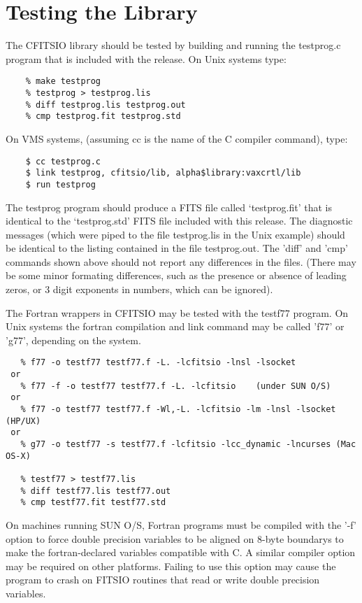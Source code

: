 \documentclass[11pt]{book}
\begin{document}
\section{Testing the Library}

The CFITSIO library should be tested by building and running
the testprog.c program that is included with the release.
On Unix systems type:

\begin{verbatim}
    % make testprog
    % testprog > testprog.lis
    % diff testprog.lis testprog.out
    % cmp testprog.fit testprog.std
\end{verbatim}
 On VMS systems,
(assuming cc is the name of the C compiler command), type:

\begin{verbatim}
    $ cc testprog.c
    $ link testprog, cfitsio/lib, alpha$library:vaxcrtl/lib
    $ run testprog
\end{verbatim}
The testprog program should produce a FITS file called `testprog.fit'
that is identical to the `testprog.std' FITS file included with this
release.  The diagnostic messages (which were piped to the file
testprog.lis in the Unix example) should be identical to the listing
contained in the file testprog.out.  The 'diff' and 'cmp' commands
shown above should not report any differences in the files.  (There
may be some minor formating differences, such as the presence or
absence of leading zeros, or 3 digit exponents in numbers,
which can be ignored).

The Fortran wrappers in CFITSIO may be tested with the testf77
program.  On Unix systems the fortran compilation and link command
may be called 'f77' or 'g77', depending on the system.

\begin{verbatim}
   % f77 -o testf77 testf77.f -L. -lcfitsio -lnsl -lsocket
 or
   % f77 -f -o testf77 testf77.f -L. -lcfitsio    (under SUN O/S)
 or
   % f77 -o testf77 testf77.f -Wl,-L. -lcfitsio -lm -lnsl -lsocket (HP/UX)
 or
   % g77 -o testf77 -s testf77.f -lcfitsio -lcc_dynamic -lncurses (Mac OS-X)

   % testf77 > testf77.lis
   % diff testf77.lis testf77.out
   % cmp testf77.fit testf77.std
\end{verbatim}
On machines running SUN O/S, Fortran programs must be compiled with the
'-f' option to force double precision variables to be aligned on 8-byte
boundarys to make the fortran-declared variables compatible with C.  A
similar compiler option may be required on other platforms.  Failing to
use this option may cause the program to crash on FITSIO routines that
read or write double precision variables.
\end{document}
